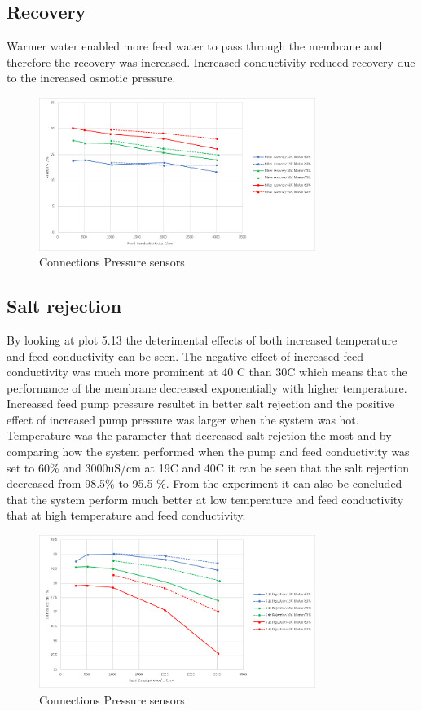 \subsection{Recovery}

Warmer water enabled more feed water to pass through the membrane and therefore the recovery was increased. Increased conductivity reduced recovery due to the increased osmotic pressure.

\begin{figure}[H]
    \centering
    \includegraphics[width=0.8\textwidth]{Recovery}
    \caption{Connections Pressure sensors}
    \label{fig:PressConn}
\end{figure}

\subsection{Salt rejection}

By looking at plot 5.13 the deterimental effects of both increased temperature and feed conductivity can be seen. The negative effect of increased feed conductivity was much more prominent at 40 C than 30C which means that the performance of the membrane decreased exponentially with higher temperature. Increased feed pump pressure resultet in better salt rejection and the positive effect of increased pump pressure was larger when the system was hot. Temperature was the parameter that decreased salt rejetion the most and by comparing how the system performed when the pump and feed conductivity was set to 60\% and 3000uS/cm at 19C and 40C it can be seen that the salt rejection decreased from 98.5\% to 95.5 \%. From the experiment it can also be concluded that the system perform much better at low temperature and feed conductivity that at high temperature and feed conductivity. 

\begin{figure}[H]
    \centering
    \includegraphics[width=0.8\textwidth]{SaltRejection}
    \caption{Connections Pressure sensors}
    \label{fig:PressConn}
\end{figure}
 
